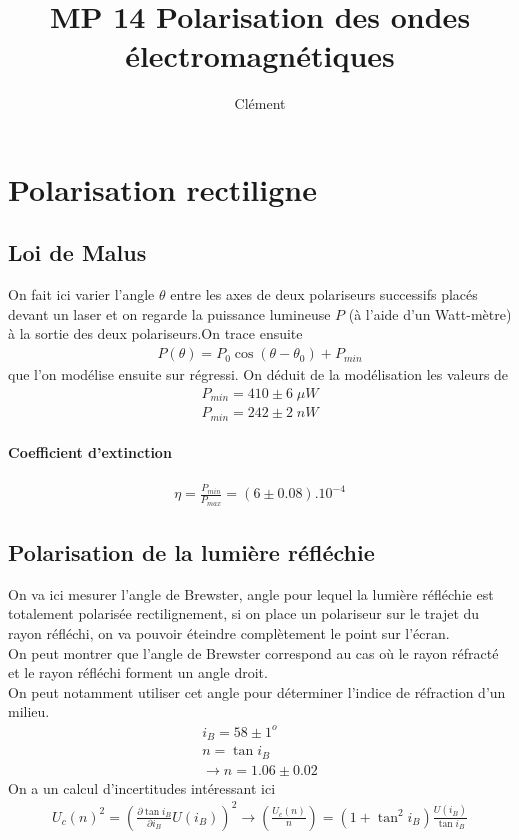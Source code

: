 \documentclass[12pt,prb,aps,epsf]{report}
\begin{document}
	
	\title{MP 14 Polarisation des ondes électromagnétiques}
\author{Clément}

\maketitle

\tableofcontents

\pagebreak

\section{Polarisation rectiligne}
\subsection{Loi de Malus}
On fait ici varier l'angle $\theta$ entre les axes de deux polariseurs successifs placés devant un laser et on regarde la puissance lumineuse $P$ (à l'aide d'un Watt-mètre) à la sortie des deux polariseurs.On trace ensuite
\begin{eqnarray}
P(\theta) = P_0\cos(\theta-\theta_0) + P_{min}
\end{eqnarray}
que l'on modélise ensuite sur régressi. On déduit de la modélisation les valeurs de 
\begin{eqnarray}
P_{min} = 410 \pm 6 \;\mu W\\
P_{min} = 242 \pm 2 \;nW
\end{eqnarray}

\paragraph{Coefficient d'extinction}
\begin{eqnarray}
\eta = \frac{P_{min}}{P_{max}} = (6\pm 0.08 ).10^{-4}
\end{eqnarray}

\subsection{Polarisation de la lumière réfléchie}
On va ici mesurer l'angle de Brewster, angle pour lequel la lumière réfléchie est totalement polarisée rectilignement, si on place un polariseur sur le trajet du rayon réfléchi, on va pouvoir éteindre complètement le point sur l'écran.\\
On peut montrer que l'angle de Brewster correspond au cas où le rayon réfracté et le rayon réfléchi forment un angle droit.\\
On peut notamment utiliser cet angle pour déterminer l'indice de réfraction d'un milieu.
\begin{eqnarray}
i_B = 58\pm 1^{o}\\
n = \tan i_B\\
\rightarrow n = 1.06 \pm 0.02
\end{eqnarray}
On a un calcul d'incertitudes intéressant ici 
\begin{eqnarray}
U_c(n)^2 = \left(\frac{\partial\tan i_B}{\partial i_B}U(i_B)\right) ^2 \rightarrow \left(\frac{U_c(n)}{n}\right) = (1+\tan ^2i_B)\frac{U(i_B)}{\tan i_B}
\end{eqnarray}
\end{document}
